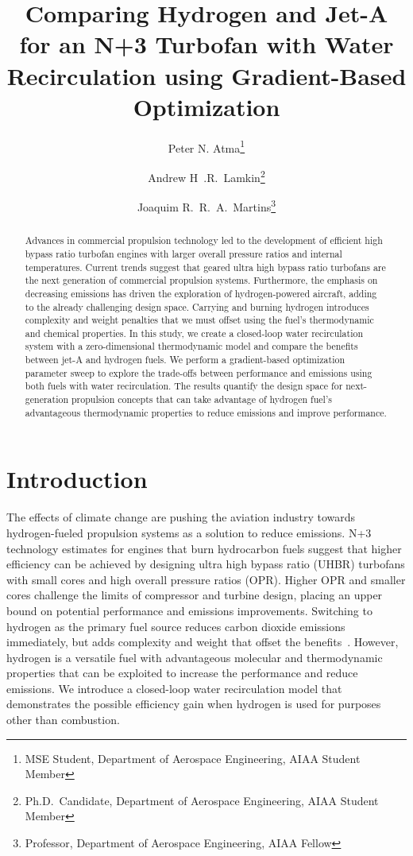 \documentclass[conf]{new-aiaa}
\title{Comparing Hydrogen and Jet-A for an N+3 Turbofan with Water Recirculation using Gradient-Based Optimization} %
\author{Peter N. Atma\footnote{MSE Student, Department of Aerospace Engineering, AIAA Student Member}}
\author{Andrew H~.R.~Lamkin\footnote{Ph.D.~Candidate, Department of Aerospace Engineering, AIAA Student Member}}
\author{Joaquim R.~R.~A.~Martins\footnote{Professor, Department of Aerospace Engineering, AIAA Fellow}}
\affil{University of Michigan, Ann Arbor, MI, 48109}
\begin{document}
\maketitle

\begin{abstract}
    Advances in commercial propulsion technology led to the development of efficient high bypass ratio turbofan engines with larger overall pressure ratios and internal temperatures.
    Current trends suggest that geared ultra high bypass ratio turbofans are the next generation of commercial propulsion systems.
    Furthermore, the emphasis on decreasing emissions has driven the exploration of hydrogen-powered aircraft, adding to the already challenging design space.
    Carrying and burning hydrogen introduces complexity and weight penalties that we must offset using the fuel's thermodynamic and chemical properties.
    In this study, we create a closed-loop water recirculation system with a zero-dimensional thermodynamic model and compare the benefits between jet-A and hydrogen fuels.
    We perform a gradient-based optimization parameter sweep to explore the trade-offs between performance and emissions using both fuels with water recirculation.
    The results quantify the design space for next-generation propulsion concepts that can take advantage of hydrogen fuel's advantageous thermodynamic properties to reduce emissions and improve performance.
\end{abstract}

\section{Introduction}
The effects of climate change are pushing the aviation industry towards hydrogen-fueled propulsion systems as a solution to reduce emissions.
N+3 technology estimates for engines that burn hydrocarbon fuels suggest that higher efficiency can be achieved by designing ultra high bypass ratio (UHBR) turbofans with small cores and high overall pressure ratios (OPR).
Higher OPR and smaller cores challenge the limits of compressor and turbine design, placing an upper bound on potential performance and emissions improvements.
Switching to hydrogen as the primary fuel source reduces carbon dioxide emissions immediately, but adds complexity and weight that offset the benefits~\cite{Adler2023}.
However, hydrogen is a versatile fuel with advantageous molecular and thermodynamic properties that can be exploited to increase the performance and reduce emissions.
We introduce a closed-loop water recirculation model that demonstrates the possible efficiency gain when hydrogen is used for purposes other than combustion.
\end{document}
